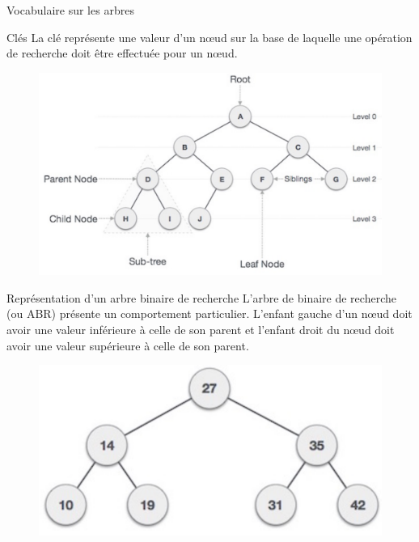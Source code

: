 \documentclass[10pt,xcolor=dvipsnames]{beamer}
\newcommand{\defin}[1]{\textcolor{darkspringgreen}{#1}}
\begin{document}
\begin{frame}{Vocabulaire sur les arbres}
        \begin{exampleblock}{Clés}
    La \defin{clé} représente une valeur d'un nœud sur la base de laquelle une opération de recherche doit être effectuée pour un nœud.
    \end{exampleblock}
    
    \begin{figure}
    \centering
    \includegraphics[scale=0.2]{figures/CM2/ABR-1.png}
    \label{fig:my_label}
\end{figure}
\end{frame}

\begin{frame}{Représentation d'un arbre binaire de recherche}
    \alert{L'arbre de binaire de recherche} (ou ABR)  présente un comportement particulier. L'enfant gauche d'un nœud doit avoir une valeur inférieure à celle de son parent et l'enfant droit du nœud doit avoir une valeur supérieure à celle de son parent.
    
    \begin{figure}
    \centering
    \includegraphics[scale=0.3]{figures/CM2/ABR-2.png}
    \label{fig:my_label}
\end{figure}
    
\end{frame}
\end{document}
